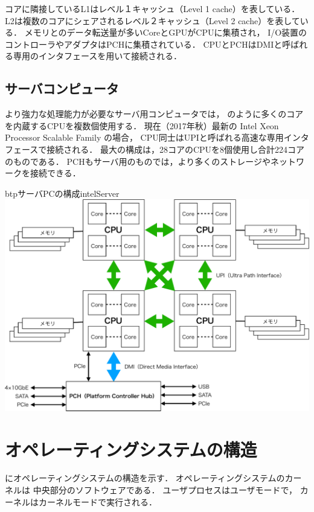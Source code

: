コアに隣接しているL1はレベル１キャッシュ（Level 1 cache）を表している．
L2は複数のコアにシェアされるレベル２キャッシュ（Level 2 cache）を表している．
メモリとのデータ転送量が多いCoreとGPUがCPUに集積され，
I/O装置のコントローラやアダプタはPCHに集積されている．
CPUとPCHはDMIと呼ばれる専用のインタフェースを用いて接続される．

\subsection{サーバコンピュータ}
より強力な処理能力が必要なサーバ用コンピュータでは，
のように多くのコアを内蔵するCPUを複数個使用する．
現在（2017年秋）最新の Intel Xeon Processor Scalable Family の場合，
CPU同士はUPIと呼ばれる高速な専用インタフェースで接続される．
最大の構成は，28コアのCPUを8個使用し合計224コアのものである．
PCHもサーバ用のものでは，より多くのストレージやネットワークを接続できる．

\begin{myfig}{btp}{サーバPCの構成}{intelServer}
  \includegraphics[scale=0.6]{Fig/intelServer-crop.pdf}
\end{myfig}

\section{オペレーティングシステムの構造}
にオペレーティングシステムの構造を示す．
オペレーティングシステムのカーネルは
中央部分のソフトウェアである．
ユーザプロセスはユーザモードで，
カーネルはカーネルモードで実行される．

